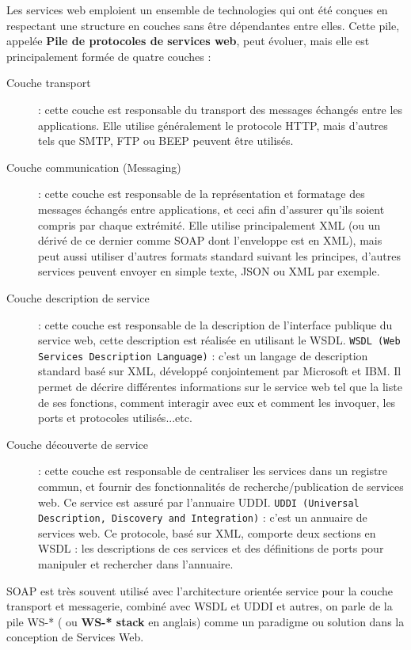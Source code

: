 Les services web emploient un ensemble de technologies qui ont été conçues en respectant une structure en couches sans être dépendantes entre elles. Cette pile, appelée \textbf{Pile de protocoles de services web}, peut évoluer, mais elle est principalement formée de quatre couches \cite{refTutorialPointsWS} :
\begin{description}
	\item[Couche transport] : cette couche est responsable du transport des messages échangés entre les applications. Elle utilise généralement le protocole HTTP, mais d'autres tels que SMTP, FTP ou BEEP peuvent être utilisés.
	\item [Couche communication (Messaging)] : cette couche est responsable de la représentation et formatage des messages échangés entre applications, et ceci afin d'assurer qu'ils soient compris par chaque extrémité. Elle utilise principalement XML (ou un dérivé de ce dernier comme SOAP dont l'enveloppe est en XML), mais peut aussi utiliser d'autres formats standard suivant les principes, d'autres services peuvent envoyer en simple texte, JSON ou XML par exemple.
	\item[Couche description de service] : cette couche est responsable de la description de l'interface publique du service web, cette description est réalisée en utilisant le WSDL.\newline
	      \texttt{WSDL (Web Services Description Language)} : c'est un langage de description standard basé sur XML, développé conjointement par Microsoft et IBM. Il permet de décrire différentes informations sur le service web tel que la liste de ses fonctions, comment interagir avec eux et comment les invoquer, les ports et protocoles utilisés...etc.
	\item[Couche découverte de service] : cette couche est responsable de centraliser les services dans un registre commun, et fournir des fonctionnalités de recherche/publication de services web. Ce service est assuré par l'annuaire UDDI.\newline
	      \texttt{UDDI (Universal Description, Discovery and Integration)} : c'est un annuaire de services web. Ce protocole, basé sur XML, comporte deux sections en WSDL : les descriptions de ces services et des définitions de ports pour manipuler et rechercher dans l'annuaire.
\end{description}

SOAP est très souvent utilisé avec l'architecture orientée service pour la couche transport et messagerie, combiné avec WSDL et UDDI et autres, on parle de la pile WS-* ( ou \textbf{WS-* stack} en anglais) comme un paradigme ou solution dans la conception de Services Web.

